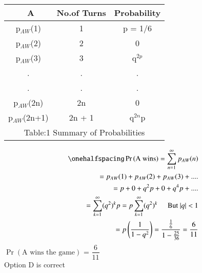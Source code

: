 \documentclass[journal,12pt,twocolumn]{IEEEtran}
\theoremstyle{definition}
\providecommand{\pr}[1]{\ensuremath{\Pr\left(#1\right)}}
\numberwithin{equation}{subsection}
\begin{document}
\centering \begin{tabular}{|c|c|c|}
    \hline\
    A&No.of Turns & Probability \\
    \hline
    p$_{AW}$(1) & 1 & p = 1/6\\
    \hline
    p$_{AW}$(2) & 2 & 0\\
    \hline
    p$_{AW}$(3) & 3 & q$^{2p}$\\
    \hline
    .&.&.\\
    .&.&.\\
    p$_{AW}$(2n) & 2n & 0\\
    \hline
    p$_{AW}$(2n+1) & 2n + 1 & q$^{2n}$p\\
    \hline
    \multicolumn{3}{c}{Table:1 Summary of Probabilities}\\
\end{tabular}

\begin{align*}
\onehalfspacing
    \pr{\text{A wins}} = \sum_{n=1}^{\infty} p_{AW}(n)\\
    = p_{AW}(1) + p_{AW}(2) + p_{AW}(3) + ....\\
    = p + 0 + q^2p + 0 + q^4p + ....\\
    = \sum_{k=1}^{\infty} (q^2)^k p
    = p \sum_{k=1}^{\infty} (q^2)^k \hspace{0.5cm} \text{But $|q| <$ 1}\\
    = p \left(\dfrac{1}{1 - q^2}\right)
    =\dfrac{\frac{1}{6}}{1 - \frac{25}{36}} = \dfrac{6}{11}
\end{align*}
\centering \Large
\pr{\text{A wins the game}} = $\dfrac{6}{11}$\\
Option D is correct
\end{document}
